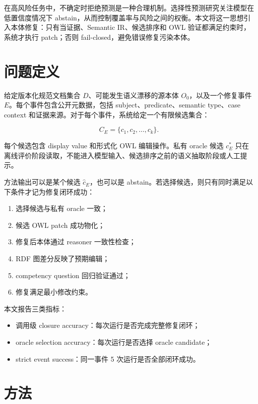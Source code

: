 \documentclass[11pt]{article}
\begin{document}
在高风险任务中，不确定时拒绝预测是一种合理机制。选择性预测研究关注模型在低置信度情况下 abstain，从而控制覆盖率与风险之间的权衡\cite{geifman2017selective}。本文将这一思想引入本体修复：只有当证据、Semantic IR、候选排序和 OWL 验证都满足约束时，系统才执行 patch；否则 fail-closed，避免错误修复污染本体。

\section{问题定义}

给定版本化规范文档集合 $D$、可能发生语义漂移的源本体 $O_0$，以及一个修复事件 $E$。每个事件包含公开元数据，包括 subject、predicate、semantic type、case context 和证据来源。对于每个事件，系统给定一个有限候选集合：

\[
C_E = \{c_1, c_2, \ldots, c_k\}.
\]

每个候选包含 display value 和形式化 OWL 编辑操作。私有 oracle 候选 $c_E^*$ 只在离线评价阶段读取，不能进入模型输入、候选排序之前的语义抽取阶段或人工提示。

方法输出可以是某个候选 $\hat{c}_E$，也可以是 abstain。若选择候选，则只有同时满足以下条件才记为修复闭环成功：

\begin{enumerate}
    \item 选择候选与私有 oracle 一致；
    \item 候选 OWL patch 成功物化；
    \item 修复后本体通过 reasoner 一致性检查；
    \item RDF 图差分反映了预期编辑；
    \item competency question 回归验证通过；
    \item 修复满足最小修改约束。
\end{enumerate}

本文报告三类指标：

\begin{itemize}
    \item 调用级 closure accuracy：每次运行是否完成完整修复闭环；
    \item oracle selection accuracy：每次运行是否选择 oracle candidate；
    \item strict event success：同一事件 5 次运行是否全部闭环成功。
\end{itemize}

\section{方法}
\end{document}
